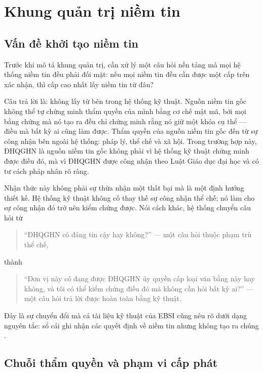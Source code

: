\section{Khung quản trị niềm tin}

\subsection{Vấn đề khởi tạo niềm tin}

Trước khi mô tả khung quản trị, cần xử lý một câu hỏi nền tảng mà mọi hệ thống niềm tin đều phải đối mặt: nếu mọi niềm tin đều cần được một cấp trên xác nhận, thì cấp cao nhất lấy niềm tin từ đâu?

Câu trả lời là: không lấy từ bên trong hệ thống kỹ thuật. Nguồn niềm tin gốc không thể tự chứng minh thẩm quyền của mình bằng cơ chế mật mã, bởi mọi bằng chứng mà nó tạo ra đều chỉ chứng minh rằng nó giữ một khóa cụ thể --- điều mà bất kỳ ai cũng làm được. Thẩm quyền của nguồn niềm tin gốc đến từ sự công nhận bên ngoài hệ thống: pháp lý, thể chế và xã hội. Trong trường hợp này, ĐHQGHN là nguồn niềm tin gốc không phải vì hệ thống kỹ thuật chứng minh được điều đó, mà vì ĐHQGHN được công nhận theo Luật Giáo dục đại học và có tư cách pháp nhân rõ ràng.

Nhận thức này không phải sự thừa nhận một thất bại mà là một định hướng thiết kế. Hệ thống kỹ thuật không cố thay thế sự công nhận thể chế; nó làm cho sự công nhận đó trở nên kiểm chứng được. Nói cách khác, hệ thống chuyển câu hỏi từ

\begin{quote}
{``}ĐHQGHN có đáng tin cậy hay không?{''} --- một câu hỏi thuộc phạm trù thể chế,
\end{quote}

thành

\begin{quote}
{``}Đơn vị này có đang được ĐHQGHN ủy quyền cấp loại văn bằng này hay không, và tôi có thể kiểm chứng điều đó mà không cần hỏi bất kỳ ai?{''} --- một câu hỏi trả lời được hoàn toàn bằng kỹ thuật.
\end{quote}

Đây là sự chuyển đổi mà cả tài liệu kỹ thuật của EBSI cũng nêu rõ dưới dạng nguyên tắc: sổ cái ghi nhận các quyết định về niềm tin nhưng không tạo ra chúng \cite{EBSI_TrustModel}.

\subsection{Chuỗi thẩm quyền và phạm vi cấp phát}

